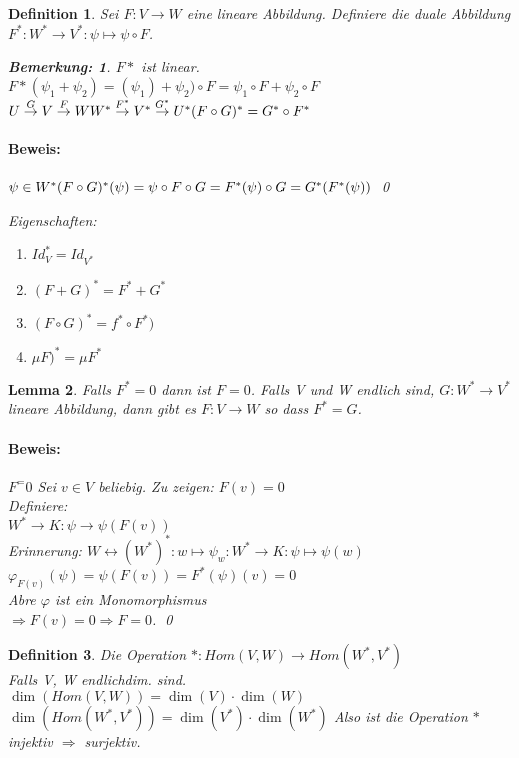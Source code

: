 \documentclass{report}
\theoremstyle{customrem}
\newtheorem*{bemerkung}{Bemerkung\textnormal:}
\theoremstyle{customdef}
\newtheorem{definition}{Definition}[chapter]
\newtheorem{lemma}[definition]{Lemma}
\renewenvironment{proof}{\paragraph{Beweis: }}{\qed}
\theoremstyle{customenv}
\begin{document}
\begin{definition}
  Sei \(F : V \to W\) eine lineare Abbildung. Definiere die duale Abbildung
  \(F^* : W^* \to V^* : \psi \mapsto \psi \circ F\).
  \begin{bemerkung}
    \(F*\) ist linear.\\
    \(
      F*(\psi_1 + \psi_2) = (\psi_1) + \psi_2) \circ F
      = \psi_1 \circ F + \psi_2 \circ F
    \)\\
    \(U \overset{G}{\to} V \overset{F}{\to} W\\
    W^* \overset{F^*}{\to} V^* \overset{G^*}{\to}{U^*}\\
    (F \circ G)^* = G^* \circ F^*\)
    \begin{proof}
      \(\psi \in W^*\\
      (F\circ G)^*(\psi) = \psi \circ F \circ G = F^*(\psi) \circ G = G^*(F^*(\psi))\)
    \end{proof}
  \end{bemerkung}
  Eigenschaften:
  \begin{enumerate}
    \item{\(Id_V^* = Id_{V^*}\)}
    \item{\((F + G)^* = F^* + G^*\)}
    \item{\((F \circ G)^* = f^* \circ F^*)\)}
    \item{\(\mu F)^* = \mu F^*\)}
  \end{enumerate}
\end{definition}

\begin{lemma}
  Falls \(F^* = 0\) dann ist \(F = 0\). Falls V und W endlich sind,
  \(G : W^* \to V^*\) lineare Abbildung, dann gibt es \(F : V \to W\) so dass
  \(F^* = G\).
  \begin{proof}
    \(F^ = 0\) Sei \(v \in V\) beliebig. Zu zeigen: \(F(v) = 0\)\\
    Definiere:\\
    \(W^* \to K : \psi \to \psi(F(v))\)\\
    Erinnerung: \(W \leftrightarrow (W^*)^* : w \mapsto \psi_w : W^* \to K : \psi \mapsto \psi(w)\)\\
    \(\varphi_{F(v)}(\psi) = \psi(F(v)) = F^*(\psi)(v) = 0\)\\
    Abre \(\varphi\) ist ein Monomorphismus\\
    \(\Rightarrow F(v) = 0 \Rightarrow F = 0\).
  \end{proof}
\end{lemma}

\begin{definition}
  Die Operation \(* : Hom(V ,W) \to Hom(W^*, V^*)\)\\
  Falls V, W endlichdim. sind.\\
  \(\dim(Hom(V, W)) = \dim(V) \cdot \dim(W)\)\\
  \(\dim(Hom(W^*, V^*)) = \dim(V^*) \cdot \dim(W^*)\)
  Also ist die Operation \(*\) injektiv \(\Rightarrow\) surjektiv.
\end{definition}
\end{document}
